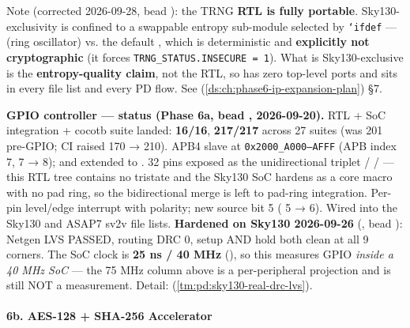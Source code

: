 \begin{record}
{}

Note (corrected 2026-09-28, bead ): the TRNG \textbf{RTL is
fully portable}. Sky130-exclusivity is confined to a swappable entropy
sub-module selected by \texttt{`ifdef} --- 
(ring oscillator) vs. the default , which is
deterministic and \textbf{explicitly not cryptographic} (it forces
\texttt{TRNG\_\allowbreak{}STATUS.\allowbreak{}INSECURE\ =\allowbreak{}\ 1}).
What is Sky130-exclusive is the \textbf{entropy-quality claim}, not the
RTL, so  has zero top-level ports and sits in every file
list and every PD flow. See  (\cref{ds:ch:phase6-ip-expansion-plan}) §7.

\textbf{GPIO controller --- status (Phase 6a, bead ,
2026-09-20).} RTL + SoC integration + cocotb suite landed:
 \textbf{16/16},  \textbf{217/217} across
27 suites (was 201 pre-GPIO; CI  raised 170 → 210).
APB4 slave at \texttt{0x2000\_\allowbreak{}A000–AFFF} (APB index 7,
 7 → 8);  and
 extended to . 32 pins exposed as
the unidirectional triplet  /  /
 --- this RTL tree contains no tristate and the Sky130
SoC hardens as a core macro with no pad ring, so the bidirectional merge
is left to pad-ring integration. Per-pin level/\allowbreak{}edge
interrupt with polarity; new  source bit 5
( 5 → 6). Wired into the Sky130 and ASAP7 sv2v file
lists. \textbf{Hardened on Sky130 2026-09-26}
(, bead ): Netgen LVS PASSED,
routing DRC 0, setup AND hold both clean at all 9 corners. \warn{} The
SoC clock is \textbf{25 ns / 40 MHz} (),
so this measures GPIO \emph{inside a 40 MHz SoC} --- the 75 MHz column
above is a per-peripheral projection and is still NOT a measurement.
Detail:  (\cref{tm:pd:sky130-real-drc-lvs}).

\end{record}

\paragraph{6b. AES-128 + SHA-256 Accelerator}\label{cr:status:roadmap:6b-aes-128-sha-256-accelerator}

